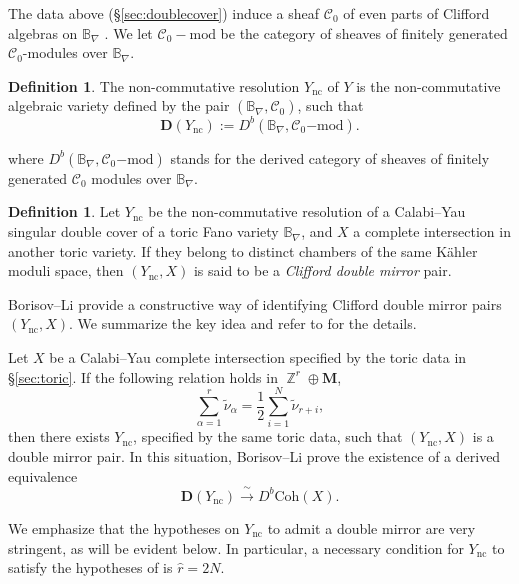 \documentclass[12pt,a4paper,oneside]{amsart}
\numberwithin{equation}{section}
\theoremstyle{definition}
\newtheorem{defin}[thm]{Definition}
\theoremstyle{remark}
\DeclareMathOperator{\Z}{\mathbb{Z}}
\newcommand{\cB}{\mathbb{B}}
\newcommand{\mC}{\mathcal{C}}
\newcommand{\Ync}{Y_{\mathrm{nc}}}
\newcommand{\DC}{\mathbf{D}}
\begin{document}
The data above (\S\ref{sec:doublecover}) induce a sheaf $\mC_0$ of even parts of Clifford algebras on $\cB_{\nabla}$ \cite{Kuznetsov:08}. We let $\mC_0-\mathrm{mod}$ be the category of sheaves of finitely generated $\mC_0$-modules over $\cB_{\nabla}$.
\begin{defin}The non-commutative resolution $\Ync$ of $Y$ is the non-commutative algebraic variety defined by the pair $(\cB_{\nabla}, \mC_0)$, such that
\begin{equation*}
	\DC (\Ync) := D^b (\cB_{\nabla}, \mC_0\mathrm{-mod}).
\end{equation*}
\end{defin}
where $D^b (\cB_{\nabla}, \mC_0\mathrm{-mod})$ stands for the derived category of sheaves of finitely generated $ \mC_0$ modules over $\cB_{\nabla}$.
\begin{defin}
	Let $\Ync$ be the non-commutative resolution of a Calabi--Yau singular double cover of a toric Fano variety $\cB_{\nabla}$, and $X$ a complete intersection in another toric variety. If they belong to distinct chambers of the same K\"ahler moduli space, then $(\Ync, X)$ is said to be a \emph{Clifford double mirror} pair.
\end{defin}
Borisov--Li \cite{BorisovLi} provide a constructive way of identifying Clifford double mirror pairs $(\Ync, X)$. We summarize the key idea and refer to \cite{BorisovLi} for the details.\par
Let $X$ be a Calabi--Yau complete intersection specified by the toric data in \S\ref{sec:toric}. If the following relation holds in $\Z^r \oplus \mathbf{M}$,
\begin{equation*}
	\sum_{\alpha=1}^{r} \tilde{\nu}_{\alpha} = \frac{1}{2} \sum_{i=1}^{N} \tilde{\nu}_{r+i},
\end{equation*}
then there exists $\Ync$, specified by the same toric data, such that $(\Ync, X)$ is a double mirror pair. In this situation, Borisov--Li prove the existence of a derived equivalence \cite[Theorem~6.3]{BorisovLi}
\begin{equation*}
	\DC (\Ync) \xrightarrow{ \ \sim \ } D^b \mathrm{Coh} (X) .
\end{equation*}\par
    We emphasize that the hypotheses on $\Ync$ to admit a double mirror are very stringent, as will be evident below. In particular, a necessary condition for $\Ync$ to satisfy the hypotheses of \cite[Theorem~6.3]{BorisovLi} is $\hat{r} =2N$.
\end{document}
